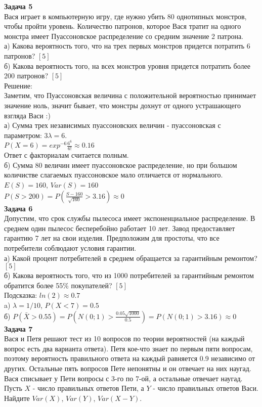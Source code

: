 \documentclass[pdftex,12pt,a4paper]{article}
\begin{document}
\textbf{Задача 5} \\ 
Вася играет в компьютерную игру, где нужно убить 80 однотипных монстров, чтобы пройти уровень. Количество патронов, которое Вася тратит на одного монстра имеет Пуассоновское распределение со средним значение 2 патрона. \\
а) Какова вероятность того, что на трех первых монстров придется потратить 6 патронов? $[5]$ \\
б) Какова вероятность того, на всех монстров уровня придется потратить более 200 патронов? $[5]$ \\
Решение: \\
Заметим, что Пуассоновская величина с положительной вероятностью принимает значение ноль, значит бывает, что монстры дохнут от одного устрашающего взгляда Васи :) \\
а) Сумма трех независимых пуассоновских величин - пуассоновская с параметром: $3\lambda=6$. \\
$P(X=6)=exp^{-6}\frac{6^6}{6!}\approx 0.16$ \\
Ответ с факториалам считается полным. \\
б) Сумма 80 величин имеет пуассоновское распределение, но при большом количистве слагаемых пуассоновское мало отличается от нормального. \\
$E(S)=160$, $Var(S)=160$ \\
$P(S>200)=P(\frac{S-160}{\sqrt{160}}>3.16)\approx 0$ \\



\textbf{Задача 6} \\ 
Допустим, что срок службы пылесоса имеет экспоненциальное распределение. В среднем один пылесос бесперебойно работает 10 лет. Завод предоставляет гарантию 7 лет на свои изделия. Предположим для простоты, что все потребители соблюдают условия гарантии. \\
а) Какой процент потребителей в среднем обращается за гарантийным ремонтом? $[5]$ \\
б) Какова вероятность того, что из 1000 потребителей за гарантийным ремонтом обратится более 55\% покупателей? $[5]$ \\
Подсказка: $ln(2)\approx 0.7$ \\
a) $\lambda=1/10$, $P(X<7)=0.5$ \\
б) $P(\bar{X}>0.55)=P(N(0;1)>\frac{0.05\sqrt{1000}}{0.5})=P(N(0;1)>3.16)\approx 0$ \\


\textbf{Задача 7} \\ %
Вася и Петя решают тест из 10 вопросов по теории вероятностей (на каждый вопрос есть два варианта ответа). Петя кое-что знает по первым пяти вопросам, поэтому вероятность правильного ответа на каждый равняется 0.9 независимо от других. Остальные пять вопросов Пете непонятны и он отвечает на них наугад. Вася списывает у Пети вопросы с 3-го по 7-ой, а остальные отвечает наугад. \\
Пусть $X$ - число правильных ответов Пети, а $Y$ - число правильных ответов Васи. \\
Найдите $Var(X)$, $Var(Y)$, $Var(X-Y)$. \\
\end{document}
